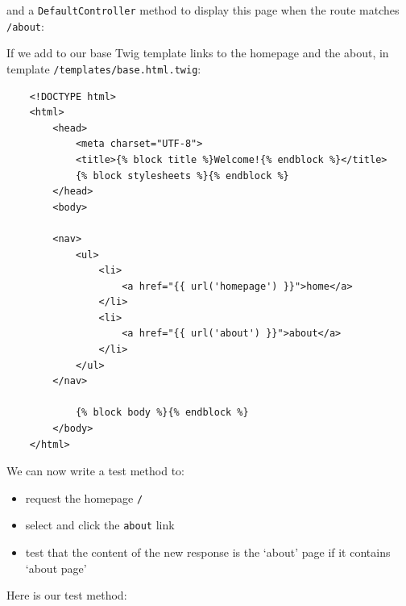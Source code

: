 \documentclass[a4paperpaper,openright]{book}
\newenvironment{Shaded}{}{}
\newcommand{\CommentTok}[1]{\textcolor[rgb]{0.38,0.63,0.69}{\textit{#1}}}
\newcommand{\KeywordTok}[1]{\textcolor[rgb]{0.00,0.44,0.13}{\textbf{#1}}}
\newcommand{\NormalTok}[1]{#1}
\newcommand{\OtherTok}[1]{\textcolor[rgb]{0.00,0.44,0.13}{#1}}
\newcommand{\StringTok}[1]{\textcolor[rgb]{0.25,0.44,0.63}{#1}}
\begin{document}
and a \texttt{DefaultController} method to display this page when the
route matches \texttt{/about}:

\begin{Shaded}
\end{Shaded}

If we add to our base Twig template links to the homepage and the about,
in template \texttt{/templates/base.html.twig}:

\begin{verbatim}
    <!DOCTYPE html>
    <html>
        <head>
            <meta charset="UTF-8">
            <title>{% block title %}Welcome!{% endblock %}</title>
            {% block stylesheets %}{% endblock %}
        </head>
        <body>

        <nav>
            <ul>
                <li>
                    <a href="{{ url('homepage') }}">home</a>
                </li>
                <li>
                    <a href="{{ url('about') }}">about</a>
                </li>
            </ul>
        </nav>

            {% block body %}{% endblock %}
        </body>
    </html>
\end{verbatim}

We can now write a test method to:

\begin{itemize}
\item
  request the homepage \texttt{/}
\item
  select and click the \texttt{about} link
\item
  test that the content of the new response is the `about' page if it
  contains `about page'
\end{itemize}

Here is our test method:
\end{document}
